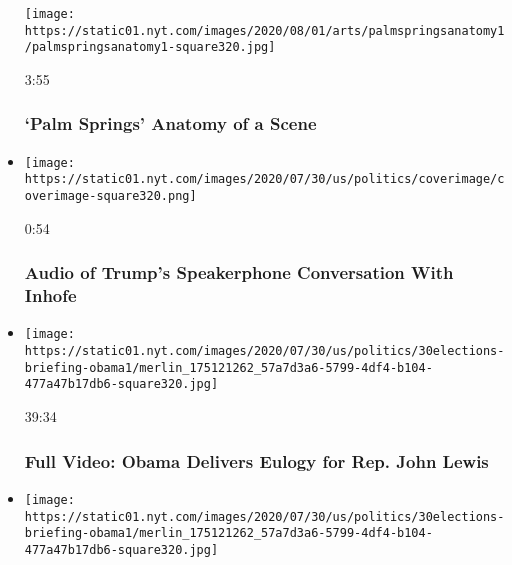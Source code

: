 \begin{itemize}
  \texttt{[image: https://static01.nyt.com/images/2020/08/01/arts/palmspringsanatomy1/palmspringsanatomy1-square320.jpg]}

  3:55

  \hypertarget{palm-springs--anatomy-of-a-scene}{%
  \subsubsection{`Palm Springs' \textbar{} Anatomy of a
  Scene}\label{palm-springs--anatomy-of-a-scene}}
\item
  \href{https://www.nytimes.com/video/us/politics/100000007265038/trump-inhofe-audio-call.html?action=click\&module=video-series-bar\&region=header\&pgtype=Article\&playlistId=video/latest-video}{}

  \texttt{[image: https://static01.nyt.com/images/2020/07/30/us/politics/coverimage/coverimage-square320.png]}

  0:54

  \hypertarget{audio-of-trumps-speakerphone-conversation-with-inhofe}{%
  \subsubsection{Audio of Trump's Speakerphone Conversation With
  Inhofe}\label{audio-of-trumps-speakerphone-conversation-with-inhofe}}
\item
  \href{https://www.nytimes.com/video/us/100000007264733/obama-john-lewis-funeral.html?action=click\&module=video-series-bar\&region=header\&pgtype=Article\&playlistId=video/latest-video}{}

  \texttt{[image: https://static01.nyt.com/images/2020/07/30/us/politics/30elections-briefing-obama1/merlin\_175121262\_57a7d3a6-5799-4df4-b104-477a47b17db6-square320.jpg]}

  39:34

  \hypertarget{full-video-obama-delivers-eulogy-for-rep-john-lewis}{%
  \subsubsection{Full Video: Obama Delivers Eulogy for Rep. John
  Lewis}\label{full-video-obama-delivers-eulogy-for-rep-john-lewis}}
\item
  \href{https://www.nytimes.com/video/us/politics/100000007264823/john-lewis-funeral.html?action=click\&module=video-series-bar\&region=header\&pgtype=Article\&playlistId=video/latest-video}{}

  \texttt{[image: https://static01.nyt.com/images/2020/07/30/us/politics/30elections-briefing-obama1/merlin\_175121262\_57a7d3a6-5799-4df4-b104-477a47b17db6-square320.jpg]}


\end{itemize}
